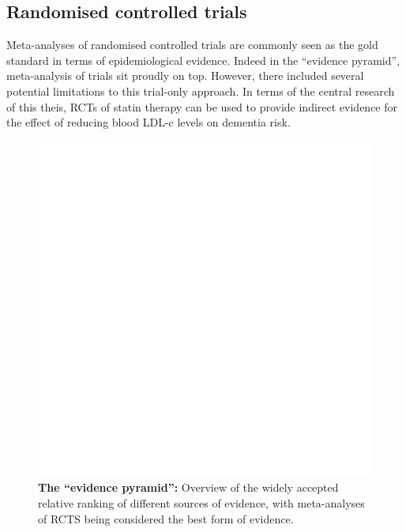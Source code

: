 \documentclass[a4paper, twoside]{templates/ociamthesis}
\begin{document}
\hypertarget{randomised-controlled-trials}{%
\subsection{Randomised controlled trials}\label{randomised-controlled-trials}}

Meta-analyses of randomised controlled trials are commonly seen as the gold standard in terms of epidemiological evidence. Indeed in the ``evidence pyramid'', meta-analysis of trials sit proudly on top. However, there included several potential limitations to this trial-only approach. In terms of the central research of this theis, RCTs of statin therapy can be used to provide indirect evidence for the effect of reducing blood LDL-c levels on dementia risk.





\begin{figure}
\includegraphics[width=1\linewidth]{figures/sys-rev/prismaflow} \caption[The ``evidence pyramid'']{\textbf{The ``evidence pyramid'':} Overview of the widely accepted relative ranking of different sources of evidence, with meta-analyses of RCTS being considered the best form of evidence.}\label{fig:evidence-pyramid}
\end{figure}
\end{document}
